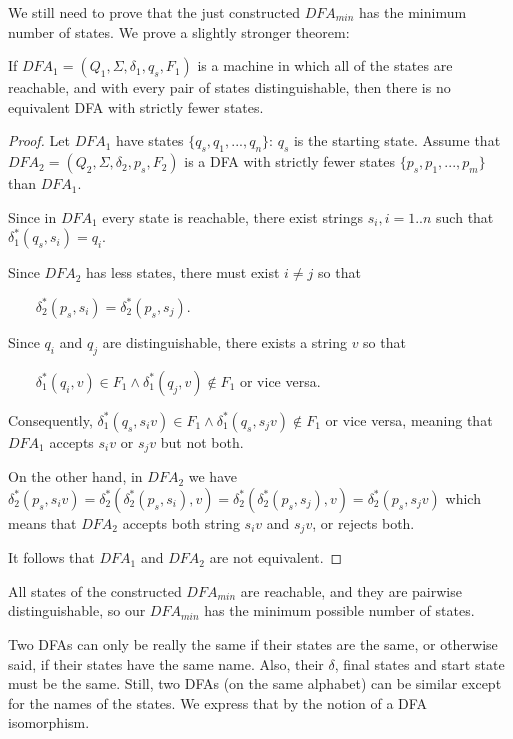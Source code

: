 
We still need to prove that the just constructed $DFA_{min}$ has the
minimum number of states. We prove a slightly stronger theorem:

\begin{theorem}
If $DFA_1 = (Q_1,\Sigma,\delta_1,q_s,F_1)$ is a machine in which all of the
states are reachable, and with every pair of states distinguishable,
then there is no equivalent DFA with strictly fewer states.
\end{theorem}
\begin{proof}
Let $DFA_1$ have states $\{q_s,q_1,...,q_n\}$: $q_s$ is the starting
state. Assume that
%
$DFA_2 = (Q_2,\Sigma,\delta_2,p_s,F_2)$ is a DFA with strictly fewer
states $\{p_s,p_1,...,p_m\}$ than $DFA_1$.

Since in $DFA_1$ every state is reachable, there exist strings $s_i,
i=1..n$ such that
%
$\delta_1^*(q_s,s_i) = q_i$.


Since $DFA_2$ has less states, there must exist $i \neq j$ so that

$~~~~~~~~~\delta_2^*(p_s,s_i) = \delta_2^*(p_s,s_j)$.


Since $q_i$ and $q_j$ are distinguishable, there exists a string $v$
so that


$~~~~~~~~~\delta_1^*(q_i,v) \in F_1 \wedge \delta_1^*(q_j,v) \notin F_1$ or vice versa.

Consequently,
%
$\delta_1^*(q_s,s_iv) \in F_1 \wedge \delta_1^*(q_s,s_jv) \notin F_1$
or vice versa, meaning that $DFA_1$ accepts $s_iv$ or $s_jv$ but not
both.


On the other hand, in $DFA_2$ we have
$\delta_2^*(p_s,s_iv) = \delta_2^*(\delta_2^*(p_s,s_i),v) =
\delta_2^*(\delta_2^*(p_s,s_j),v) = \delta_2^*(p_s,s_jv)$
which means that $DFA_2$ accepts both string $s_iv$ and $s_jv$,
or rejects both.

It follows that $DFA_1$ and $DFA_2$ are not equivalent.
\end{proof}

All states of the constructed $DFA_{min}$ are reachable, and they are
pairwise distinguishable, so our $DFA_{min}$ has the minimum possible
number of states.


Two DFAs can only be really the same if their states are the same, or
otherwise said, if their states have the same name. Also, their
$\delta$, final states and start state must be the same. Still, two
DFAs (on the same alphabet) can be similar except for the names of the
states. We express that by the notion of a DFA isomorphism.

